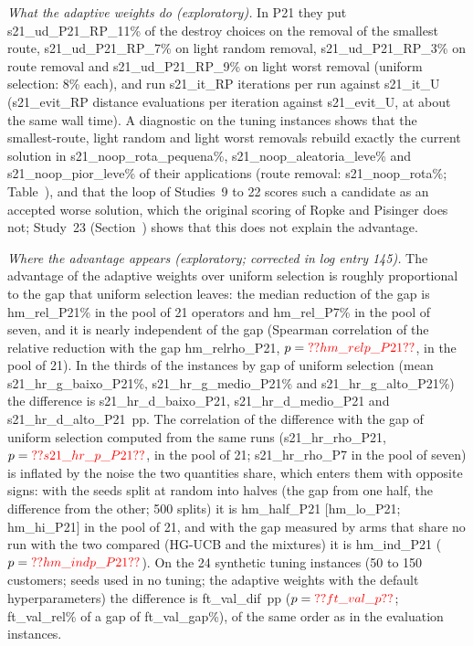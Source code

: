 \emph{What the adaptive weights do (exploratory).} In P21 they put \num{s21_ud_P21_RP_11}\% of the destroy choices on the removal of the smallest route, \num{s21_ud_P21_RP_7}\% on light random removal, \num{s21_ud_P21_RP_3}\% on route removal and \num{s21_ud_P21_RP_9}\% on light worst removal (uniform selection: 8\% each), and run \num{s21_it_RP} iterations per run against \num{s21_it_U} (\num{s21_evit_RP} distance evaluations per iteration against \num{s21_evit_U}, at about the same wall time). A diagnostic on the tuning instances shows that the smallest-route, light random and light worst removals rebuild exactly the current solution in \num{s21_noop_rota_pequena}\%, \num{s21_noop_aleatoria_leve}\% and \num{s21_noop_pior_leve}\% of their applications (route removal: \num{s21_noop_rota}\%; Table~), and that the loop of Studies~9 to 22 scores such a candidate as an accepted worse solution, which the original scoring of Ropke and Pisinger does not; Study~23 (Section~) shows that this does not explain the advantage.

\emph{Where the advantage appears (exploratory; corrected in log entry 145).} The advantage of the adaptive weights over uniform selection is roughly proportional to the gap that uniform selection leaves: the median reduction of the gap is \num{hm_rel_P21}\% in the pool of 21 operators and \num{hm_rel_P7}\% in the pool of seven, and it is nearly independent of the gap (Spearman correlation of the relative reduction with the gap \num{hm_relrho_P21}, $p=\num{hm_relp_P21}$, in the pool of 21). In the thirds of the instances by gap of uniform selection (mean \num{s21_hr_g_baixo_P21}\%, \num{s21_hr_g_medio_P21}\% and \num{s21_hr_g_alto_P21}\%) the difference is \num{s21_hr_d_baixo_P21}, \num{s21_hr_d_medio_P21} and \num{s21_hr_d_alto_P21}~pp. The correlation of the difference with the gap of uniform selection computed from the same runs (\num{s21_hr_rho_P21}, $p=\num{s21_hr_p_P21}$, in the pool of 21; \num{s21_hr_rho_P7} in the pool of seven) is inflated by the noise the two quantities share, which enters them with opposite signs: with the seeds split at random into halves (the gap from one half, the difference from the other; 500 splits) it is \num{hm_half_P21} [\num{hm_lo_P21}; \num{hm_hi_P21}] in the pool of 21, and with the gap measured by arms that share no run with the two compared (HG-UCB and the mixtures) it is \num{hm_ind_P21} ($p=\num{hm_indp_P21}$). On the 24 synthetic tuning instances (50 to 150 customers; seeds used in no tuning; the adaptive weights with the default hyperparameters) the difference is \num{ft_val_dif}~pp ($p=\num{ft_val_p}$; \num{ft_val_rel}\% of a gap of \num{ft_val_gap}\%), of the same order as in the evaluation instances.

